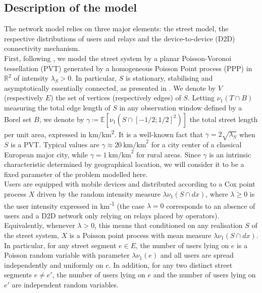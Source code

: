 \documentclass[conference]{IEEEtran}
\begin{document}
\subsection{Description of the model}
The network model relies on three major elements: the street model, the respective distributions of users and relays and the device-to-device (D2D) connectivity mechanism. \\
\indent First, following \cite{courtat_promenade_2012,chiu_stochastic_2013}, we model the street system by a planar Poisson-Voronoi tessellation (PVT) generated by a homogeneous Poisson Point process (PPP) in $\mathbb{R}^{2}$ of intensity $\lambda_{S} > 0$. In particular, $S$ is stationary, stabilising and asymptotically essentially connected, as presented in \cite{hirsch_continuum_2017}. We denote by $V$ (respectively $E$) the set of vertices (respectively edges) of $S$. Letting $\nu_{1}(T \cap B)$ measuring the total edge length of $S$ in any observation window defined by a Borel set $B$, we  denote by $\gamma \coloneqq \mathbb{E}\left[\nu_{1}\left(S \cap \left[-1/2;1/2\right]^{2}\right)\right]$ the total street length per unit area, expressed in km/km\textsuperscript{2}. It is a well-known fact \cite{moller_random_1989,moller_lectures_2012} that $\gamma = 2\sqrt{\lambda_{S}}$ when $S$ is a PVT. Typical values are $\gamma \approx 20 \: \text{km/km}^{2}$ for a city center of a classical European major city, while $\gamma = 1  \: \text{km/km}^{2}$ for rural areas. Since $\gamma$ is an intrinsic characteristic determined by geographical location, we will consider it to be a fixed parameter of the problem modelled here.  \\ %
\indent Users are equipped with mobile devices and distributed according to a Cox point process $X$ driven by the random intensity measure $\lambda \nu_{1}(S \cap dx)$, where $\lambda \geq 0$ is the user intensity expressed in km\textsuperscript{-1} (the case $\lambda = 0$ corresponds to an absence of users and a D2D network only relying on relays placed by operators). Equivalently, whenever $\lambda > 0$, this means that conditioned on any realisation $S$ of the street system, $X$ is a Poisson point process with mean measure $\lambda \nu_{1}(S \cap dx)$. In particular, for any street segment $e \in E$, the number of users lying on $e$ is a Poisson random variable with parameter $\lambda \nu_{1}(e)$ and all users are spread independently and uniformly on $e$. In addition, for any two distinct street segments $e \neq e'$, the number of users lying on $e$ and the number of users lying on $e'$ are independent random variables.\\
\end{document}
